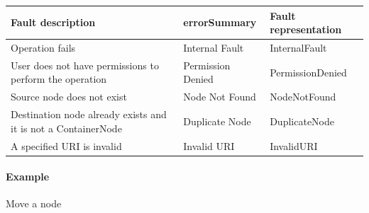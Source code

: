 \documentclass[11pt,a4paper]{ivoa}
\begin{document}
\vspace{3mm}
\begin{tabular}{ p{5cm} l p{4cm} }
\textbf{Fault description} & \textbf{errorSummary} & \textbf{Fault representation} \\
\hline
Operation fails & Internal Fault & InternalFault \\
\hline
User does not have permissions to perform the operation &Permission Denied & PermissionDenied \\
\hline
Source node does not exist & Node Not Found & NodeNotFound \\
\hline
Destination node already exists and it is not a ContainerNode & Duplicate Node & DuplicateNode \\
\hline
A specified URI is invalid & Invalid URI & InvalidURI \\
\hline
\end{tabular}
\vspace{3mm}

\paragraph{Example}
Move a node
\end{document}
